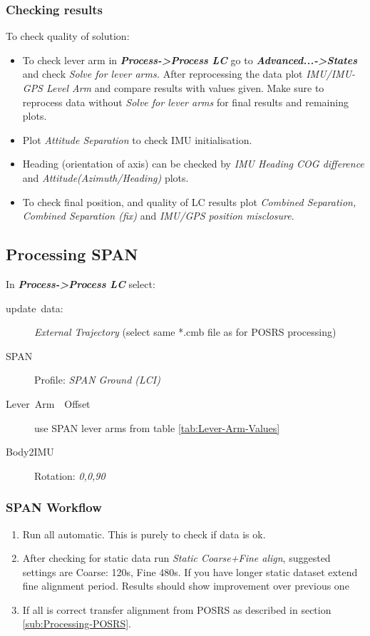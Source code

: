 \documentclass[british]{book}
\begin{document}
\subsubsection{Checking results}

To check quality of solution:
\begin{itemize}
	\item To check lever arm in \textbf{\emph{Process->Process LC}} go to \textbf{\emph{Advanced...->States }}and check\emph{ Solve for lever arms. }After reprocessing the data plot\emph{ IMU/IMU-GPS Level Arm} and compare results with values given. Make sure to reprocess data without \emph{Solve for lever arms }for final results and remaining plots.
	\item Plot \emph{Attitude Separation} to check IMU initialisation.
	\item Heading (orientation of axis) can be checked by \emph{IMU Heading COG difference} and \emph{Attitude(Azimuth/Heading)} plots.
	\item To check final position, and quality of LC results plot \emph{Combined Separation, Combined Separation (fix)} and\emph{ IMU/GPS position misclosure}. 
\end{itemize}

\subsection{Processing SPAN}\label{sub:Processing-SPAN}

In \textbf{\emph{Process->Process LC}} select:
\begin{description}
	\item [{update~data:}] \emph{External Trajectory }(select same {*}.cmb
	file as for POSRS processing)
	\item [{SPAN}] Profile: \emph{SPAN Ground (LCI) }
	\item [{Lever~Arm~~Offset}] use SPAN lever arms from table \ref{tab:Lever-Arm-Values}
	\item [{Body2IMU}] Rotation: \emph{0,0,90}
\end{description}

\subsubsection{SPAN Workflow\label{sub:SPAN-Workflow}}

\begin{enumerate}
\item Run all automatic. This is purely to check if data is ok.
\item After checking for static data run \emph{Static Coarse+Fine align}, suggested settings are Coarse: 120s, Fine 480s. If you have longer static dataset extend fine alignment period. Results should show improvement over previous one
\item If all is correct transfer alignment from POSRS as described in section \ref{sub:Processing-POSRS}.
\end{enumerate}
\end{document}
